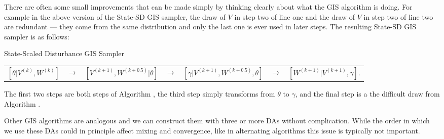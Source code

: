 \documentclass[12pt]{article}
\begin{document}
There are often some small improvements that can be made simply by thinking clearly about what the GIS algorithm is doing. For example in the above version of the State-SD GIS sampler, the draw of $V$ in step two of line one and the draw of $V$ in step two of line two are redundant --- they come from the same distribution and only the last one is ever used in later steps. The resulting State-SD GIS sampler is as follows:
\begin{alg*}State-Scaled Disturbance GIS Sampler
{\small \vspace{-.5cm}
\label{alg:DLMstateerror}
\begin{center}
\begin{tabular}{lllllll}
$[\theta|V^{(k)},W^{(k)}]$ & $\to$ & $[V^{(k+1)},W^{(k+0.5)}|\theta]$ & $\to$ & $[\gamma|V^{(k+1)},W^{(k+0.5)},\theta]$ & $\to$ & $[W^{(k+1)}|V^{(k+1)},\gamma]$.
\end{tabular}
\end{center}
}
\end{alg*}
\noindent
The first two steps are both steps of Algorithm , the third step simply transforms from $\theta$ to $\gamma$, and the final step is a the difficult draw from Algorithm .

Other GIS algorithms are analogous and we can construct them with three or more DAs without complication. While the order in which we use these DAs could in principle affect mixing and convergence, like in alternating algorithms this issue is typically not important.
\end{document}
